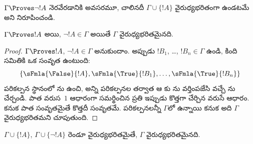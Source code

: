 \documentclass[../../../include/open-logic-section]{subfiles}
\begin{document}
\begin{prob}
$\Gamma \Proves \lnot !A$ నెరవేరడానికి అవసరమూ, చాలినదీ
$\Gamma \cup \{!A\}$ వైరుధ్యభరితంగా ఉండటమే అని నిరూపించండి.
\end{prob}

\begin{prop}
  $\Gamma \Proves !A$ అయి, $\lnot !A \in \Gamma$ అయితే $\Gamma$
  వైరుధ్యభరితమైనది.
\end{prop}

\begin{proof}
  $\Gamma \Proves !A$, $\lnot !A \in \Gamma$ అనుకుందాం. అప్పుడు
  $!B_1$, \dots, $!B_n \in \Gamma$ ఉండి, కింది సమితికి ఒక సంవృత
   ఉంటుంది:
  \[
  \{\sFmla{\False}{!A}, \sFmla{\True}{!B_1}, \dots, \sFmla{\True}{!B_n}\}
  \]
  పరికల్పన  స్థానంలో
  ను ఉంచి, అన్ని పరికల్పనల తర్వాత ఆ
  కు \TRule{\True}{\lnot}ను వర్తింపజేసి
  వచ్చే ను చేర్చండి. పాత  వరుస~$1$ ఆధారంగా సమర్థించిన ప్రతి
   ఇప్పుడు కొత్తగా చేర్చిన వరుసే ఆధారం. కనుక పాత  సంవృతమైతే
  కొత్తదీ సంవృతమే. పరికల్పనలన్నీ $\Gamma$లో ఉన్నాయి కనుక అది
  $\Gamma$ వైరుధ్యభరితమని చూపుతుంది.
\end{proof}

\begin{prop}
  $\Gamma \cup \{!A\}$, $\Gamma \cup \{\lnot !A\}$ రెండూ
  వైరుధ్యభరితమైతే, $\Gamma$ వైరుధ్యభరితమైనది.
\end{prop}
\end{document}

